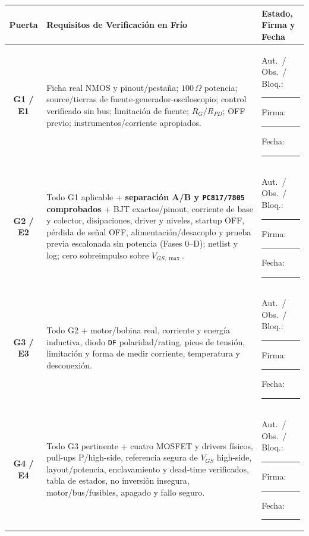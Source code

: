 \documentclass[10pt, a4paper, landscape]{article}
\begin{document}
\par\vspace{0.1cm}\noindent
\renewcommand{\arraystretch}{1.38}
{\small
\begin{tabularx}{\linewidth}{|c|>{\raggedright\arraybackslash}X|>{\raggedright\arraybackslash}p{4.8cm}|}
\hline
\rowcolor{ucbgray}
\textbf{Puerta} & \textbf{Requisitos de Verificación en Frío} & \textbf{Estado, Firma y Fecha} \\ \hline
\textbf{G1 / E1} & Ficha real NMOS y pinout/pestaña; $100\,\Omega$ potencia; source/tierras de fuente-generador-osciloscopio; control verificado sin bus; limitación de fuente; $R_G/R_{PD}$; OFF previo; instrumentos/corriente apropiados. & Aut.\ / Obs.\ / Bloq.: \rule{1.5cm}{0.4pt}\newline Firma: \rule{2.7cm}{0.4pt}\newline Fecha: \rule{2.7cm}{0.4pt} \\ \hline
\textbf{G2 / E2} & Todo G1 aplicable + \textbf{separación A/B y \texttt{PC817/7805} comprobados} + BJT exactos/pinout, corriente de base y colector, disipaciones, driver y niveles, startup OFF, pérdida de señal OFF, alimentación/desacoplo y prueba previa escalonada sin potencia (Fases 0--D); netlist y log; cero sobreimpulso sobre $V_{GS,\max}$. & Aut.\ / Obs.\ / Bloq.: \rule{1.5cm}{0.4pt}\newline Firma: \rule{2.7cm}{0.4pt}\newline Fecha: \rule{2.7cm}{0.4pt} \\ \hline
\textbf{G3 / E3} & Todo G2 + motor/bobina real, corriente y energía inductiva, diodo \texttt{DF} polaridad/rating, picos de tensión, limitación y forma de medir corriente, temperatura y desconexión. & Aut.\ / Obs.\ / Bloq.: \rule{1.5cm}{0.4pt}\newline Firma: \rule{2.7cm}{0.4pt}\newline Fecha: \rule{2.7cm}{0.4pt} \\ \hline
\textbf{G4 / E4} & Todo G3 pertinente + cuatro MOSFET y drivers físicos, pull-ups P/high-side, referencia segura de $V_{GS}$ high-side, layout/potencia, enclavamiento y dead-time verificados, tabla de estados, no inversión insegura, motor/bus/fusibles, apagado y fallo seguro. & Aut.\ / Obs.\ / Bloq.: \rule{1.5cm}{0.4pt}\newline Firma: \rule{2.7cm}{0.4pt}\newline Fecha: \rule{2.7cm}{0.4pt} \\ \hline
\end{tabularx}
}
\end{document}
